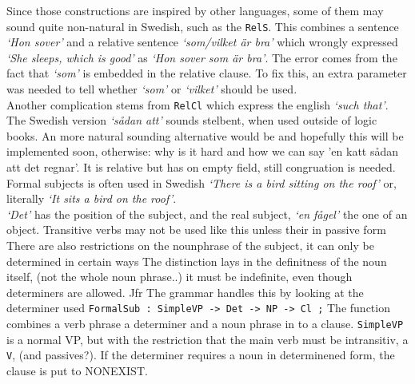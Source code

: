 \documentclass{report}
\begin{document}
Since those constructions are inspired by other languages, some of them may sound quite
non-natural in Swedish, such as the \verb|RelS|. This combines a sentence \emph{`Hon sover'}
and a relative sentence \emph{`som/vilket är bra'} which wrongly expressed 
\emph{`She sleeps, which is good'} as
\emph{`Hon sover som är bra'}. The error comes from the fact that \emph{`som'} is
embedded in the relative clause. To fix this, an extra parameter was needed to tell whether
\emph{`som'} or \emph{`vilket'} should be used. \\
Another complication stems from \verb|RelCl| which express the english \emph{`such that'}.
The Swedish version \emph{`sådan att'} sounds stelbent, when used outside of logic books.
An more natural sounding alternative would be
and hopefully this will be implemented soon, otherwise: why is it hard and how we can say
'en katt sådan att det regnar'. It is relative but has on empty field, still congruation is
needed.\\


Formal subjects \cite{SAG-19,H&H-309d} is often used in Swedish
\emph{`There is a bird sitting on the roof'}
or, literally
\emph{`It sits a bird on the roof'}.\\
\emph{`Det'} has the position of the subject, and the real subject, 
\emph{`en fågel'} the one of an object.
Transitive verbs may not be used like this
unless their in passive form
There are also restrictions on the nounphrase of the subject, it can only
be determined in certain ways
The distinction lays in the definitness of the noun itself, (not the whole noun phrase..)
it must be indefinite, even though determiners are allowed. Jfr
The grammar handles this by looking at the determiner used
\verb|FormalSub : SimpleVP -> Det -> NP -> Cl ;|
The function combines a verb phrase a determiner and a noun phrase in to a clause.
\verb|SimpleVP| is a normal VP, but with the restriction that the main verb must be
intransitiv, a \verb|V|, (and passives?). If the  determiner requires a noun in determinened
form, the clause is put to NONEXIST.
\end{document}
